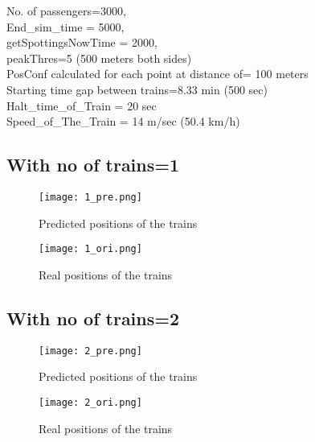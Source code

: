 No. of passengers=3000,\\
End\_sim\_time = 5000,\\
getSpottingsNowTime = 2000,\\
peakThres=5 (500 meters both sides)\\
PosConf calculated for each point at distance of= 100 meters\\
Starting time gap between trains=8.33 min (500 sec)\\
Halt\_time\_of\_Train = 20 sec\\
Speed\_of\_The\_Train = 14 m/sec (50.4 km/h)\\

\subsection{With no of trains=1 }
\begin{figure}[h!]
\begin{minipage}{.5\textwidth}

\centering
\texttt{[image: 1\_pre.png]}
\caption{Predicted positions of the trains}

\end{minipage}%
\begin{minipage}{.5\textwidth}

\centering
\texttt{[image: 1\_ori.png]}
\caption{Real positions of the trains}

\end{minipage}%
\end{figure}
\subsection{With no of trains=2 }
\begin{figure}[h!]
\begin{minipage}{.5\textwidth}

\label{No of trains=2}
\centering
\texttt{[image: 2\_pre.png]}
\caption{Predicted positions of the trains}

\end{minipage}%
\begin{minipage}{.5\textwidth}

\centering
\texttt{[image: 2\_ori.png]}
\caption{Real positions of the trains}

\end{minipage}%
\end{figure}
